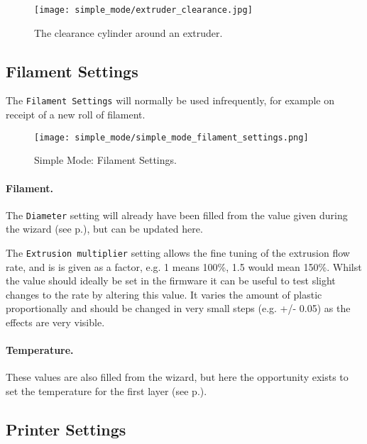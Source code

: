 \begin{figure}[H]
\centering
\texttt{[image: simple\_mode/extruder\_clearance.jpg]}
\caption{The clearance cylinder around an extruder.}
\label{fig:a_diagram_depicting_extruder_clearance}
\end{figure}


\subsection{Filament Settings}

The \texttt{Filament Settings} will normally be used infrequently, for example on receipt of a new roll of filament.

\begin{figure}[H]
\centering
\texttt{[image: simple\_mode/simple\_mode\_filament\_settings.png]}
\caption{Simple Mode: Filament Settings.}
\label{fig:simple_mode_filament_settings}
\end{figure}

\paragraph{Filament.} %
\label{par:filament}
The \texttt{Diameter} setting will already have been filled from the value given during the wizard (see p.\pageref{sub:4_filament_diameter}), but can be updated here.

The \texttt{Extrusion multiplier} setting allows the fine tuning of the extrusion flow rate, and is is given as a factor, e.g. 1 means 100\%, 1.5 would mean 150\%.  Whilst the value should ideally be set in the firmware it can be useful to test slight changes to the rate by altering this value.  It varies the amount of plastic proportionally and should be changed in very small steps (e.g. +/- 0.05) as the effects are very visible.

\paragraph{Temperature.} %
\label{par:temperature}
These values are also filled from the wizard, but here the opportunity exists to set the temperature for the first layer (see p.\pageref{sec:the_important_first_layer}).


\subsection{Printer Settings}

